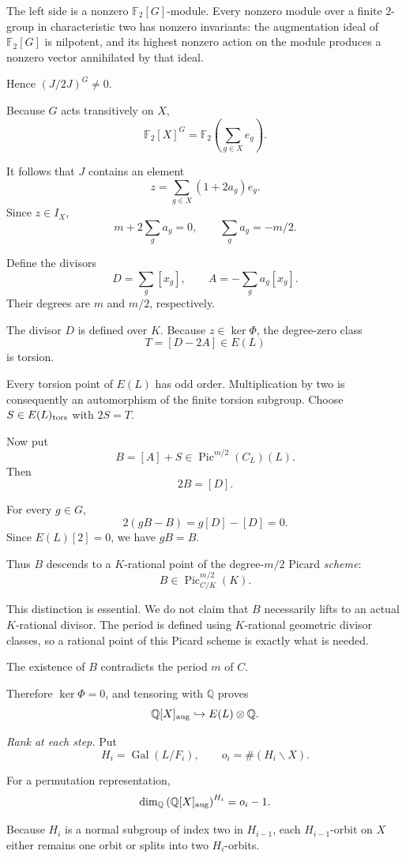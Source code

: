 \documentclass[11pt]{article}
\begin{document}
The left side is a nonzero
$\mathbb F_2[G]$-module. Every nonzero module
over a finite $2$-group in characteristic two
has nonzero invariants: the augmentation ideal
of $\mathbb F_2[G]$ is nilpotent, and its
highest nonzero action on the module produces
a nonzero vector annihilated by that ideal.

Hence $(J/2J)^G\ne0$.

Because $G$ acts transitively on $X$,
\[
\mathbb F_2[X]^G
=
\mathbb F_2\left(\sum_{g\in X}e_g\right).
\]

It follows that $J$ contains an element
\[
z=\sum_{g\in X}(1+2a_g)e_g.
\]
Since $z\in I_X$,
\[
m+2\sum_g a_g=0,
\qquad
\sum_g a_g=-m/2.
\]

Define the divisors
\[
D=\sum_g[x_g],
\qquad
A=-\sum_g a_g[x_g].
\]
Their degrees are $m$ and $m/2$, respectively.

The divisor $D$ is defined over $K$.
Because $z\in\ker\Phi$, the degree-zero
class
\[
T=[D-2A]\in E(L)
\]
is torsion.

Every torsion point of $E(L)$ has odd order.
Multiplication by two is consequently an
automorphism of the finite torsion subgroup.
Choose $S\in E(L)_{\rm tors}$ with $2S=T$.

Now put
\[
B=[A]+S\in\operatorname{Pic}^{m/2}(C_L)(L).
\]
Then
\[
2B=[D].
\]

For every $g\in G$,
\[
2(gB-B)=g[D]-[D]=0.
\]
Since $E(L)[2]=0$, we have $gB=B$.

Thus $B$ descends to a $K$-rational point
of the degree-$m/2$ Picard \emph{scheme}:
\[
B\in\operatorname{Pic}^{m/2}_{C/K}(K).
\]

This distinction is essential. We do not
claim that $B$ necessarily lifts to an actual
$K$-rational divisor. The period is defined
using $K$-rational geometric divisor classes,
so a rational point of this Picard scheme is
exactly what is needed.

The existence of $B$ contradicts the
period $m$ of $C$.

Therefore $\ker\Phi=0$, and tensoring with
$\mathbb Q$ proves
\[
\mathbb Q[X]_{\rm aug}
\hookrightarrow
E(L)\otimes\mathbb Q.
\]

\medskip
\emph{Rank at each step.}
Put
\[
H_i=\operatorname{Gal}(L/F_i),
\qquad
o_i=\#(H_i\backslash X).
\]

For a permutation representation,
\[
\dim_{\mathbb Q}
\left(\mathbb Q[X]_{\rm aug}\right)^{H_i}
=o_i-1.
\]

Because $H_i$ is a normal subgroup of index
two in $H_{i-1}$, each $H_{i-1}$-orbit on $X$
either remains one orbit or splits into two
$H_i$-orbits.
\end{document}
